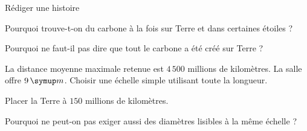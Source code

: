 \par\noindent\begin{minipage}{\linewidth}
\begin{exercice}[3]{Rédiger une histoire}
\begin{questions}
\item Pourquoi trouve-t-on du carbone à la fois sur Terre et dans certaines étoiles ?
\item Pourquoi ne faut-il pas dire que tout le carbone a été créé sur Terre ?
\end{questions}
\end{exercice}
\end{minipage}
\label{defi-ex-7}
\begin{questions}
\item La distance moyenne maximale retenue est $4\,500$ millions de kilomètres. La salle offre $9\unite m$. Choisir une échelle simple utilisant toute la longueur.
\item Placer la Terre à $150$ millions de kilomètres.
\item Pourquoi ne peut-on pas exiger aussi des diamètres lisibles à la même échelle ?
\end{questions}
\pcGrille
